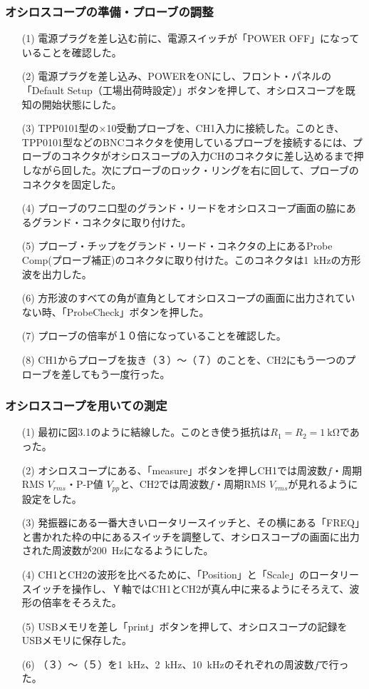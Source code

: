\documentclass[12pt,a4paper]{jsarticle}
\numberwithin{equation}{section}
\numberwithin{figure}{section}
\numberwithin{table}{section}
\begin{document}
\subsubsection{オシロスコープの準備・プローブの調整}
\begin{itemize}
	\item [(1)]電源プラグを差し込む前に、電源スイッチが「POWER OFF」になっていることを確認した。
	\item [(2)]電源プラグを差し込み、POWERをONにし、フロント・パネルの「Default Setup（工場出荷時設定）」ボタンを押して、オシロスコープを既知の開始状態にした。
	\item [(3)]TPP0101型の×10受動プローブを、CH1入力に接続した。このとき、TPP0101型などのBNCコネクタを使用しているプローブを接続するには、プローブのコネクタがオシロスコープの入力CHのコネクタに差し込めるまで押しながら回した。次にプローブのロック・リングを右に回して、プローブのコネクタを固定した。
	\item [(4)]プローブのワニ口型のグランド・リードをオシロスコープ画面の脇にあるグランド・コネクタに取り付けた。
	\item [(5)]プローブ・チップをグランド・リード・コネクタの上にあるProbe Comp(プローブ補正)のコネクタに取り付けた。このコネクタは\SI{1}{\kilo\hertz}の方形波を出力した。
	\item [(6)]方形波のすべての角が直角としてオシロスコープの画面に出力されていない時、「ProbeCheck」ボタンを押した。
	\item [(7)]プローブの倍率が１０倍になっていることを確認した。
	\item [(8)]CH1からプローブを抜き（３）～（７）のことを、CH2にもう一つのプローブを差してもう一度行った。
\end{itemize}

\newpage
\subsubsection{オシロスコープを用いての測定}
\begin{itemize}
	\item [(1)]最初に図3.1のように結線した。このとき使う抵抗は$R_1=R_2=\SI{1}{\kilo\ohm}$であった。
	\item [(2)]オシロスコープにある、「measure」ボタンを押しCH1では周波数$f$・周期RMS $V_{rms}$・P-P値 $V_{pp}$と、CH2では周波数$f$・周期RMS $V_{rms}$が見れるように設定をした。
	\item [(3)]発振器にある一番大きいロータリースイッチと、その横にある「FREQ」と書かれた枠の中にあるスイッチを調整して、オシロスコープの画面に出力された周波数が\SI{200}{\hertz}になるようにした。
	\item [(4)]CH1とCH2の波形を比べるために、「Position」と「Scale」のロータリースイッチを操作し、Ｙ軸ではCH1とCH2が真ん中に来るようにそろえて、波形の倍率をそろえた。
	\item [(5)]USBメモリを差し「print」ボタンを押して、オシロスコープの記録をUSBメモリに保存した。
	\item [(6)]（３）～（５）を\SI{1}{\kilo\hertz}、\SI{2}{\kilo\hertz}、\SI{10}{\kilo\hertz}のそれぞれの周波数$f$で行った。
\end{itemize}
\end{document}
